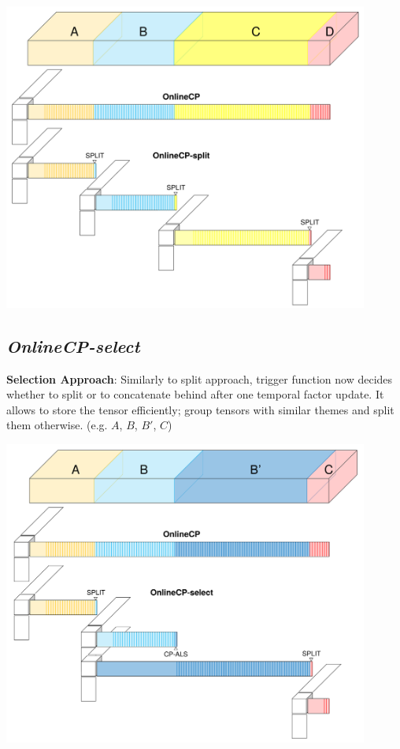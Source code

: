 \begin{center}
	\includegraphics[width=0.9\textwidth]{FIG/OnlineCP-split.png}
\end{center}

\newpage
\subsection{\em OnlineCP-select}
\textbf{Selection Approach}: Similarly to split approach, trigger function now decides whether to split or to concatenate behind after one temporal factor update. It allows to store the tensor efficiently; group tensors with similar themes and split them otherwise. (e.g. $A$, $B$, $B'$, $C$)

\begin{center}
	\includegraphics[width=0.9\textwidth]{FIG/OnlineCP-select.png}
\end{center}